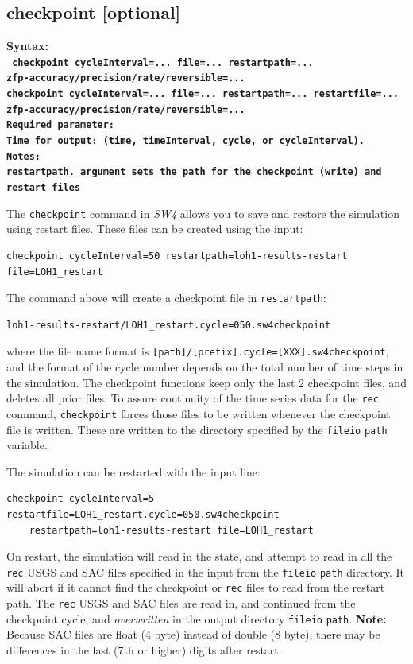\documentclass[11pt]{report}
\begin{document}
\subsection{checkpoint [optional]}
\label{keyword:checkpoint}
\begin{flushleft}
\bf Syntax:\\ \tt
checkpoint cycleInterval=... file=... restartpath=... \\ zfp-{accuracy/precision/rate/reversible}=...\\
checkpoint cycleInterval=... file=... restartpath=... restartfile=... \\
zfp-{accuracy/precision/rate/reversible}=...\\
\bf Required parameter:\\
\rm Time for output: (time, timeInterval, cycle, or cycleInterval).\\
\bf Notes:\\
\rm \verb+restartpath+. argument sets the path for the checkpoint
  (write) and restart files
\end{flushleft}
%
The \verb+checkpoint+ command in \emph{SW4} allows you to save
and restore the simulation using restart files.
These files can be created using the input:
\begin{verbatim}
checkpoint cycleInterval=50 restartpath=loh1-results-restart file=LOH1_restart
\end{verbatim}
The command above will create a checkpoint file in \verb+restartpath+:
\begin{verbatim}
loh1-results-restart/LOH1_restart.cycle=050.sw4checkpoint
\end{verbatim}
  where the file name format is {\tt [path]/[prefix].cycle=[XXX].sw4checkpoint},
  and the format of the cycle number depends on the total number
  of time steps in the simulation.
The checkpoint functions keep only the last 2 checkpoint files, and deletes
  all prior files.
To assure continuity of the time series data for the \verb+rec+ command,
  \verb+checkpoint+ forces those files to be written whenever the checkpoint
  file is written.
These are written to the directory specified by the \verb+fileio+ \verb+path+
  variable.

The simulation can be restarted with the input line:
\begin{verbatim}
checkpoint cycleInterval=5 restartfile=LOH1_restart.cycle=050.sw4checkpoint
    restartpath=loh1-results-restart file=LOH1_restart
\end{verbatim}
On restart, the simulation will read in the state, and attempt to
  read in all the \verb+rec+ USGS and SAC files specified in the
  input from the \verb+fileio+ \verb+path+ directory.
It will abort if it cannot find the checkpoint or \verb+rec+ files to read
  from the restart path.
The \verb+rec+ USGS and SAC files are read in, and continued from the
  checkpoint cycle, and \emph{overwritten} in the output 
  directory \verb+fileio+ \verb+path+.
{\bf Note:} Because SAC files are float (4 byte) instead of double (8 byte),
  there may be differences in the last (7th or higher) digits after restart.
\end{document}
